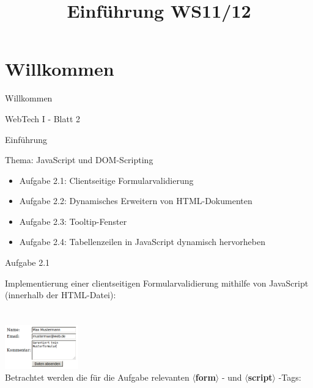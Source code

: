 \documentclass{beamer}
\title{Einführung WS11/12}
\begin{document}
\section{Willkommen}
\begin{frame}{Willkommen}
\begin{center}
\huge
WebTech I - Blatt 2
\vspace{7mm}

\end{center}
\end{frame}

\begin{frame}{Einführung}
\begin{center}Thema: JavaScript und DOM-Scripting\end{center}
\begin{itemize}
\item Aufgabe 2.1: Clientseitige Formularvalidierung
\item Aufgabe 2.2: Dynamisches Erweitern von HTML-Dokumenten
\item Aufgabe 2.3: Tooltip-Fenster
\item Aufgabe 2.4: Tabellenzeilen in JavaScript dynamisch hervorheben
\end{itemize}
\end{frame}

\begin{frame}{Aufgabe 2.1}
\begin{center}
Implementierung einer clientseitigen Formularvalidierung mithilfe von JavaScript (innerhalb der HTML-Datei):\\
~\\~\\
\includegraphics[width = 120px]{A1/src/formvali.png}
\\
Betrachtet werden die für die Aufgabe relevanten $\langle${\bf form}$\rangle$ - und $\langle${\bf script}$\rangle$ -Tags:
\end{center}
\end{frame}
\end{document}
